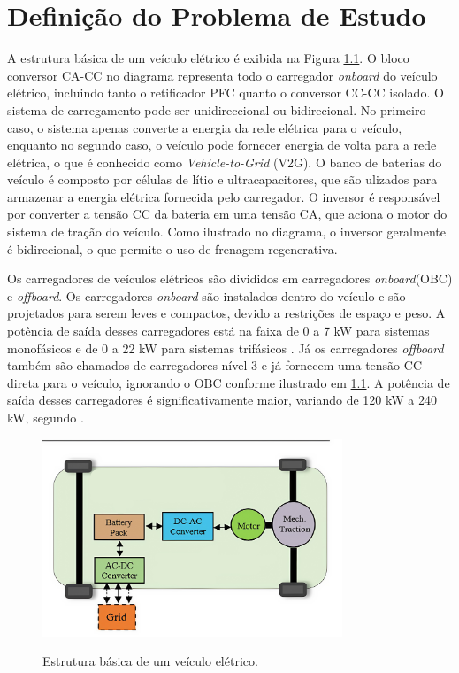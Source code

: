 \chapter{Definição do Problema de Estudo}

A estrutura básica de um veículo elétrico é exibida na Figura
\ref{fig:estrutura-veiculo-eletrico}. O bloco conversor CA-CC no diagrama representa todo o
carregador \textit{onboard} do veículo elétrico, incluindo tanto o retificador PFC quanto o
conversor CC-CC isolado. O sistema de carregamento pode ser unidireccional ou bidirecional. No
primeiro caso, o sistema apenas converte a energia da rede elétrica para o veículo, enquanto no
segundo caso, o veículo pode fornecer energia de volta para a rede elétrica, o que é conhecido
como \textit{Vehicle-to-Grid} (V2G). O banco de baterias do veículo é composto por células de
lítio e ultracapacitores, que são ulizados para armazenar a energia elétrica fornecida pelo
carregador. O inversor é responsável por converter a tensão CC da bateria em uma tensão CA, que
aciona o motor do sistema de tração do veículo. Como ilustrado no diagrama, o inversor
geralmente é bidirecional, o que permite o uso de frenagem regenerativa.

Os carregadores de veículos elétricos são divididos em carregadores \textit{onboard}(OBC) e
\textit{offboard}. Os carregadores \textit{onboard} são instalados dentro do veículo e são
projetados para serem leves e compactos, devido a restrições de espaço e peso. A potência de
saída desses carregadores está na faixa de 0 a 7 kW para sistemas monofásicos e de 0 a 22 kW
para sistemas trifásicos \cite{Yuan:2021}. Já os carregadores \textit{offboard} também são
chamados de carregadores nível 3 e já fornecem uma tensão CC direta para o veículo, ignorando o
OBC conforme ilustrado em \ref{fig:estrutura-veiculo-eletrico}. A potência de saída desses
carregadores é significativamente maior, variando de 120 kW a 240 kW, segundo
\cite{texas:2020}.

\begin{figure}[htb]
    \centering
    \caption{Estrutura básica de um veículo elétrico.}
    \includegraphics[width=0.8\textwidth]{figuras/diagrama_veiculo_eletrico_edit.png}
    \label{fig:estrutura-veiculo-eletrico}
\end{figure}

